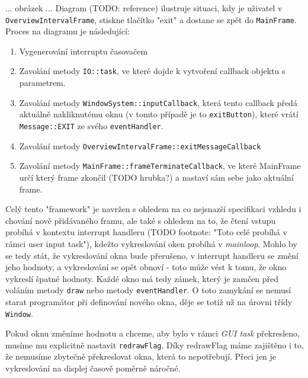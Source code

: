 ... obrázek ...
Diagram (TODO: reference) ilustruje situaci, kdy je uživatel v \texttt{OverviewIntervalFrame}, stiskne
tlačítko "exit" a dostane se zpět do \texttt{MainFrame}.
Proces na diagramu je následující:
\begin{enumerate}
  \item Vygenerování interruptu časovačem
  \item Zavolání metody \texttt{IO::task}, ve které dojde k vytvoření callback objektu s parametrem.
  \item Zavolání metody \texttt{WindowSystem::inputCallback}, která tento callback předá aktuálně
    nakliknutému oknu (v tomto případě je to \texttt{exitButton}), které vrátí \texttt{Message::EXIT}
    ze svého \texttt{eventHandler}.
  \item Zavolání metody \texttt{OverviewIntervalFrame::exitMessageCallback}
  \item Zavolání metody \texttt{MainFrame::frameTerminateCallback}, ve které MainFrame určí který
    frame zkončil (TODO hrubka?) a nastaví sám sebe jako aktuální frame.
\end{enumerate}


Celý tento "framework" je navržen s ohledem na co nejsnazší specifikaci vzhledu i chování nově přidávaného
framu, ale také s ohledem na to, že čtení vstupu probíhá v kontextu interrupt handleru (TODO footnote:
"Toto celé probíhá v rámci user input task"), kdežto vykreslování oken probíhá v \emph{mainloop}.
Mohlo by se tedy stát, že vykreslování okna bude přerušeno, v interrupt handleru se změní jeho hodnoty,
a vykreslování se opět obnoví - toto může vést k tomu, že okno vykreslí špatné hodnoty.
Každé okno má tedy zámek, který je zamčen před voláním metody \texttt{draw} nebo metody \texttt{eventHandler}.
O toto zamykání se nemusí starat programátor při definování nového okna, děje se totiž už na úrovni
třídy \texttt{Window}.

Pokud oknu změníme hodnotu a chceme, aby bylo v rámci \emph{GUI task} překresleno, musíme mu explicitně
nastavit \texttt{redrawFlag}.
Díky redrawFlag máme zajištěno i to, že nemusíme zbytečně překreslovat okna, která to nepotřebují.
Přeci jen je vykreslování na displej časově poměrně náročné.





